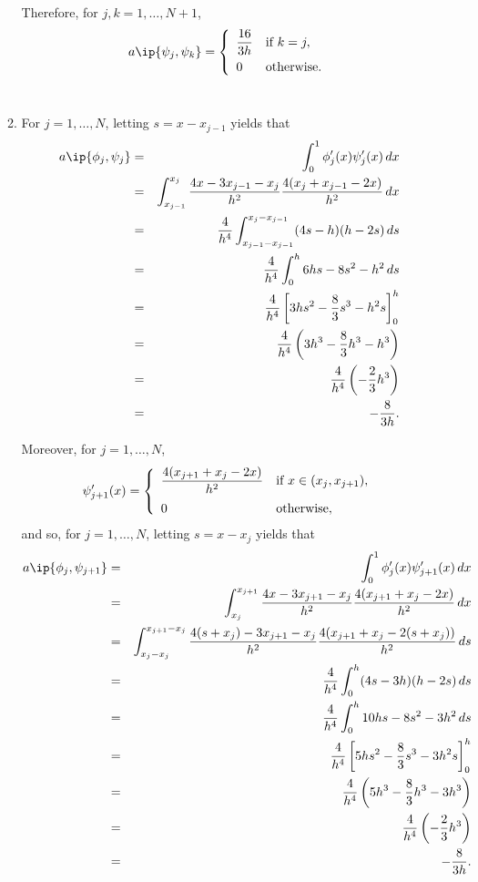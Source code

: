 \begin{solution}
\begin{enumerate}
\begin{enumerate}
Therefore, for $j,k=1,\ldots,N+1$,
\[
a\ip{\psi_j,\psi_k}=\left\{\begin{array}{ll}\displaystyle{{16 \over 3h}} & \mbox{if }k=j, \\[.75em] \displaystyle{0} & \mbox{otherwise}.\end{array}\right.
\]
\\
\item For $j=1,\ldots,N$, letting $s=x-x_{j-1}$ yields that
\begin{eqnarray*}
a\ip{\phi_j,\psi_j}&=&\int_0^1\phi_j'(x)\psi_j'(x)\,dx
\\
&=&\int_{x_{j-1}}^{x_j}{4x-3x_{j-1}-x_j \over h^2}{4(x_j+x_{j-1}-2x) \over h^2}\,dx
\\
&=&{4 \over h^4}\int_{x_{j-1}-x_{j-1}}^{x_j-x_{j-1}}(4s-h)(h-2s)\,ds
\\
&=&{4 \over h^4}\int_0^h6hs-8s^2-h^2\,ds
\\
&=&{4 \over h^4}\left[3hs^2-{8 \over 3}s^3-h^2s\right]_0^h
\\
&=&{4 \over h^4}\left(3h^3-{8 \over 3}h^3-h^3\right)
\\
&=&{4 \over h^4}\left(-{2 \over 3}h^3\right)
\\
&=&-{8 \over 3h}.
\end{eqnarray*}

Moreover, for $j=1,\ldots,N$,
\[
\psi_{j+1}'(x)=\left\{\begin{array}{ll}
\displaystyle{{4(x_{j+1}+x_j-2x) \over h^2}} & \displaystyle{\mbox{if }x\in(x_j,x_{j+1})},
\\[10pt]
0 & \mbox{otherwise},
\end{array}\right.
\]
and so, for $j=1,\ldots,N$, letting $s=x-x_j$ yields that
\begin{eqnarray*}
a\ip{\phi_j,\psi_{j+1}}&=&\int_0^1\phi_j'(x)\psi_{j+1}'(x)\,dx
\\
&=&\int_{x_j}^{x_{j+1}}{4x-3x_{j+1}-x_j \over h^2}{4(x_{j+1}+x_j-2x) \over h^2}\,dx
\\
&=&\int_{x_j-x_j}^{x_{j+1}-x_j}{4(s+x_j)-3x_{j+1}-x_j \over h^2}{4(x_{j+1}+x_j-2(s+x_j)) \over h^2}\,ds
\\
&=&{4 \over h^4}\int_0^h(4s-3h)(h-2s)\,ds
\\
&=&{4 \over h^4}\int_0^h10hs-8s^2-3h^2\,ds
\\
&=&{4 \over h^4}\left[5hs^2-{8 \over 3}s^3-3h^2s\right]_0^h
\\
&=&{4 \over h^4}\left(5h^3-{8 \over 3}h^3-3h^3\right)
\\
&=&{4 \over h^4}\left(-{2 \over 3}h^3\right)
\\
&=&-{8 \over 3h}.
\end{eqnarray*}


\end{enumerate}
\end{enumerate}
\end{solution}
